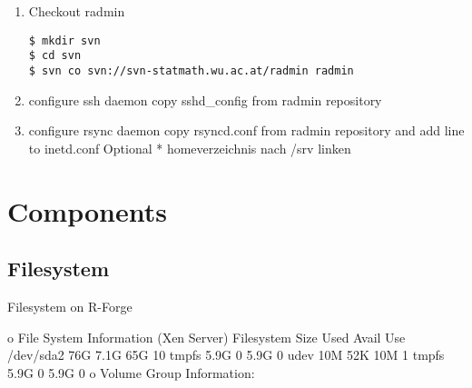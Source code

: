 \documentclass[a4paper]{article}
\begin{document}
\begin{enumerate}
	\item Checkout radmin
\medskip

\begin{lstlisting}[frame=single, framerule=0.95pt]
$ mkdir svn
$ cd svn
$ svn co svn://svn-statmath.wu.ac.at/radmin radmin 
\end{lstlisting}

        \item configure ssh daemon 
copy sshd\_config from radmin repository
        \item configure rsync daemon 
copy rsyncd.conf from radmin repository and add line to inetd.conf
Optional * homeverzeichnis nach /srv linken
\end{enumerate}

 \section{Components}
 \label{sec:registration}

 \subsection{Filesystem}
 Filesystem on R-Forge 
 
o File System Information (Xen Server)
		Filesystem            Size  Used Avail Use%
		/dev/sda2              76G  7.1G   65G  10%
		tmpfs                 5.9G     0  5.9G   0%
		udev                   10M   52K   10M   1%
		tmpfs                 5.9G     0  5.9G   0%
	o Volume Group Information:
\end{document}
